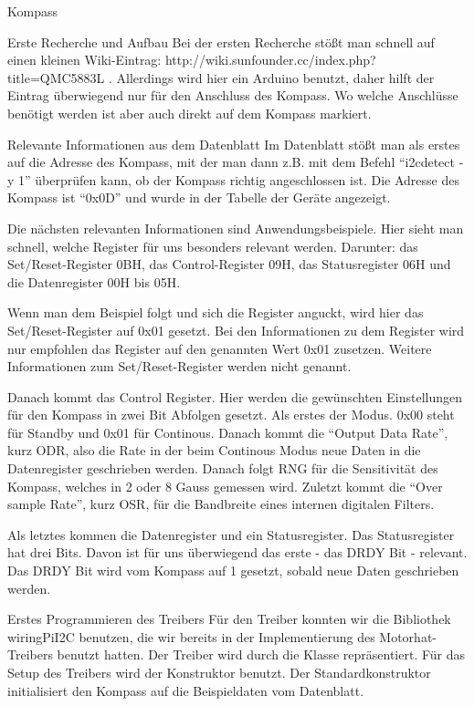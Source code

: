 \documentclass[12pt]{report}
\begin{document}
\begin{section}{Kompass}
  \begin{subsection}{Erste Recherche und Aufbau}
  Bei der ersten Recherche stößt man schnell auf einen kleinen Wiki-Eintrag: 
  http://wiki.sunfounder.cc/index.php?title=QMC5883L .
  Allerdings wird hier ein Arduino benutzt, daher hilft der Eintrag überwiegend nur für den 
  Anschluss des Kompass. Wo welche Anschlüsse benötigt werden ist aber auch direkt auf dem Kompass markiert.
  \end{subsection}
  \begin{subsection}{Relevante Informationen aus dem Datenblatt}
  Im Datenblatt stößt man als erstes auf die \itoc{} Adresse des Kompass, mit der man dann z.B. mit dem Befehl 
  "`i2cdetect -y 1"' überprüfen kann, ob der Kompass richtig angeschlossen ist. Die Adresse des Kompass ist "`0x0D"' 
  und wurde in der Tabelle der \itoc{} Geräte angezeigt.
  
  Die nächsten relevanten Informationen sind Anwendungsbeispiele. Hier sieht man schnell, welche Register für 
  uns besonders relevant werden. Darunter: das Set/Reset-Register 0BH, das
  Control-Register 09H, das Statusregister 06H und die Datenregister 00H bis 05H. 
  
  Wenn man dem Beispiel folgt und sich die Register anguckt, wird hier das Set/Reset-Register auf 0x01 gesetzt.
  Bei den Informationen zu dem Register wird nur empfohlen das Register auf den genannten Wert 0x01 zusetzen. 
  Weitere Informationen zum Set/Reset-Register werden nicht genannt.
  
  Danach kommt das Control Register. Hier werden die gewünschten Einstellungen für den Kompass in zwei Bit 
  Abfolgen gesetzt. Als erstes der Modus. 0x00 steht für Standby und 0x01 für
  Continous. Danach kommt die "`Output Data Rate"', kurz ODR, 
  also die Rate in der beim Continous Modus neue Daten in die Datenregister
  geschrieben werden. Danach folgt RNG für die 
  Sensitivität des Kompass, welches in 2 oder 8 Gauss gemessen wird. Zuletzt
  kommt die "`Over sample Rate"', kurz OSR, für die Bandbreite eines internen digitalen Filters.
  
  Als letztes kommen die Datenregister und ein Statusregister. Das Statusregister hat drei Bits. Davon ist für 
  uns überwiegend das erste - das DRDY Bit - relevant. Das DRDY Bit wird vom Kompass auf 1 gesetzt, sobald neue Daten 
  geschrieben werden.
  \end{subsection}
  \begin{subsection}{Erstes Programmieren des Treibers}
  Für den Treiber konnten wir die \wiringPi{} Bibliothek wiringPiI2C benutzen, die wir bereits in der 
  Implementierung des Motorhat-Treibers benutzt hatten. Der Treiber wird durch
  die Klasse  repräsentiert. Für das Setup des Treibers wird der Konstruktor benutzt. 
  Der Standardkonstruktor initialisiert den Kompass auf die Beispieldaten vom Datenblatt.
  

\end{subsection}
\end{section}
\end{document}
